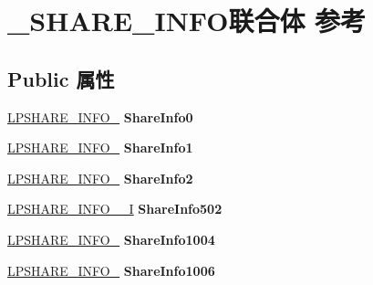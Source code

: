 \hypertarget{union___s_h_a_r_e___i_n_f_o}{}\section{\+\_\+\+S\+H\+A\+R\+E\+\_\+\+I\+N\+F\+O联合体 参考}
\label{union___s_h_a_r_e___i_n_f_o}
\subsection*{Public 属性}
\begin{DoxyCompactItemize}
\item 
\mbox{\label{union___s_h_a_r_e___i_n_f_o_a7bdd1623874a992136c747f78d3c9cfc}} 
\hyperlink{struct___s_h_a_r_e___i_n_f_o__0}{L\+P\+S\+H\+A\+R\+E\+\_\+\+I\+N\+F\+O\+\_} {\bfseries Share\+Info0}
\item 
\mbox{\label{union___s_h_a_r_e___i_n_f_o_a1507e7f916cd0308a61e1e0f232155b5}} 
\hyperlink{struct___s_h_a_r_e___i_n_f_o__1}{L\+P\+S\+H\+A\+R\+E\+\_\+\+I\+N\+F\+O\+\_} {\bfseries Share\+Info1}
\item 
\mbox{\label{union___s_h_a_r_e___i_n_f_o_aaab89127b720d0d262ac03e2a96b40c1}} 
\hyperlink{struct___s_h_a_r_e___i_n_f_o__2}{L\+P\+S\+H\+A\+R\+E\+\_\+\+I\+N\+F\+O\+\_} {\bfseries Share\+Info2}
\item 
\mbox{\label{union___s_h_a_r_e___i_n_f_o_ad73cd8029738149493a754478317c682}} 
\hyperlink{struct___s_h_a_r_e___i_n_f_o__502___i}{L\+P\+S\+H\+A\+R\+E\+\_\+\+I\+N\+F\+O\+\_\+\_\+I} {\bfseries Share\+Info502}
\item 
\mbox{\label{union___s_h_a_r_e___i_n_f_o_a0ed075050f4636267a7d3a9e1227dc41}} 
\hyperlink{struct___s_h_a_r_e___i_n_f_o__1004}{L\+P\+S\+H\+A\+R\+E\+\_\+\+I\+N\+F\+O\+\_} {\bfseries Share\+Info1004}
\item 
\mbox{\label{union___s_h_a_r_e___i_n_f_o_aca4f7cbf66a4a007c1ddc34c50afd422}} 
\hyperlink{struct___s_h_a_r_e___i_n_f_o__1006}{L\+P\+S\+H\+A\+R\+E\+\_\+\+I\+N\+F\+O\+\_} {\bfseries Share\+Info1006}
\item 

\end{DoxyCompactItemize}
